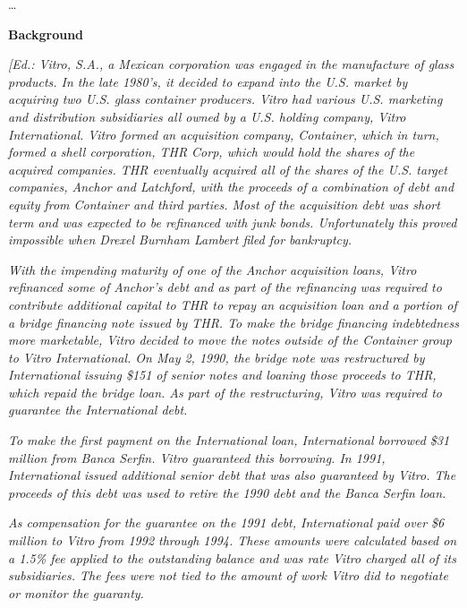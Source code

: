 \begin{select}
\ldots
\begin{center} \textbf{Background}
\end{center}

\textit{[Ed.: Vitro, S.A., a Mexican corporation was engaged in the manufacture of glass products.  In the late 1980's, it decided to expand into the U.S. market by acquiring two U.S. glass container producers.  Vitro had various U.S. marketing and distribution subsidiaries all owned by a U.S. holding company, Vitro International.  Vitro formed an acquisition  company, Container, which in turn, formed a shell corporation, THR Corp, which would hold the shares of the acquired companies.  THR eventually acquired all of the shares of the U.S. target companies, Anchor and Latchford, with the proceeds of a combination of debt and equity from Container and third parties.  Most of the acquisition debt was short term and was expected to be refinanced with junk bonds.  Unfortunately  this proved impossible when Drexel Burnham Lambert filed for bankruptcy.}

\textit{With the impending maturity of one of the Anchor acquisition loans, Vitro refinanced some of Anchor's debt and as part of the refinancing was required to contribute additional capital to THR to repay an acquisition loan and a portion of a bridge financing note issued by THR.  To make the bridge financing indebtedness more marketable, Vitro decided to move the notes outside of the Container group to Vitro International.  On May 2, 1990, the bridge note was restructured by International issuing \$151 of senior notes and loaning those proceeds to THR, which repaid the bridge loan.  As part of the restructuring, Vitro was required to guarantee the International debt.}

\textit{To make the first payment on the International loan, International borrowed \$31 million from Banca Serfin.  Vitro guaranteed this borrowing.  In 1991, International issued additional senior debt that was also guaranteed by Vitro.  The proceeds of this debt was used to retire the 1990 debt and the Banca Serfin loan.}

\textit{As compensation for the guarantee on the 1991 debt, International paid over \$6 million to Vitro from 1992 through 1994.  These amounts were calculated based on a 1.5\% fee applied to the outstanding balance and was rate Vitro charged all of its subsidiaries.  The fees were not tied to the amount of work Vitro did to negotiate or monitor the guaranty. }


\end{select}
